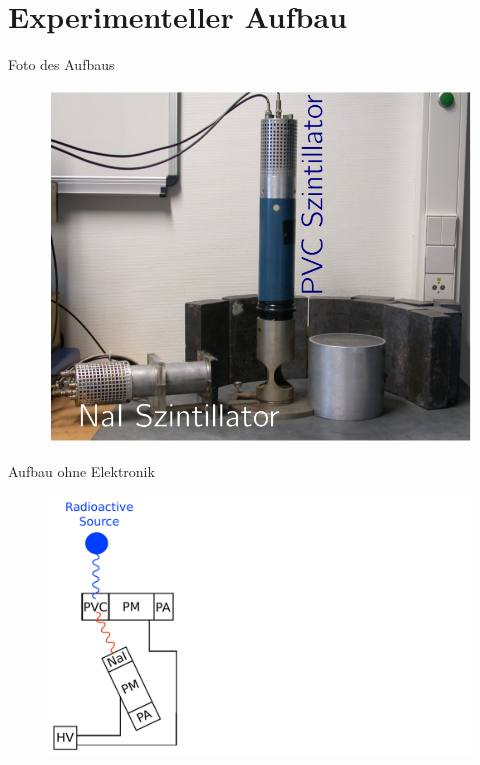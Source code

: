 \documentclass[xcolor=x11names,compress]{beamer}
\renewcommand{\(}{\begin{columns}}
\renewcommand{\)}{\end{columns}}
\newcommand{\<}[1]{\begin{column}{#1}}
\renewcommand{\>}{\end{column}}
\begin{document}
\section{Experimenteller Aufbau}
\begin{frame}[t]{Foto des Aufbaus}
\begin{figure}[htpb]
    \centering
    \includegraphics[width=0.7\linewidth]{../figures/photographie1}
\label{fig:foto}
\end{figure}
\end{frame}

\begin{frame}[t]{Aufbau ohne Elektronik}
\begin{figure}[htpb]
    \centering
    \includegraphics[width=1.0\linewidth]{../figures/setup_pres_pre}
\label{fig:setup_pre}
\end{figure}
\end{frame}
\end{document}

